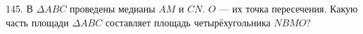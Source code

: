 145. В $\Delta ABC$ проведены медианы $AM$ и $CN.$
$O$ --- их точка пересечения. Какую часть площади $\Delta ABC$ составляет площадь четырёхугольника $NBMO?$\\
